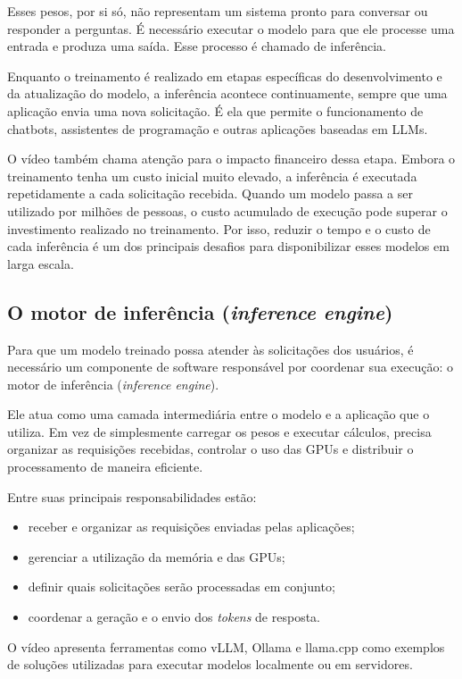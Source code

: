 \documentclass[12pt, a4paper]{article}
\begin{document}
Esses pesos, por si só, não representam um sistema pronto para conversar ou responder a perguntas. É necessário executar o modelo para que ele processe uma entrada e produza uma saída. Esse processo é chamado de inferência.

Enquanto o treinamento é realizado em etapas específicas do desenvolvimento e da atualização do modelo, a inferência acontece continuamente, sempre que uma aplicação envia uma nova solicitação. É ela que permite o funcionamento de chatbots, assistentes de programação e outras aplicações baseadas em LLMs.

O vídeo também chama atenção para o impacto financeiro dessa etapa. Embora o treinamento tenha um custo inicial muito elevado, a inferência é executada repetidamente a cada solicitação recebida. Quando um modelo passa a ser utilizado por milhões de pessoas, o custo acumulado de execução pode superar o investimento realizado no treinamento. Por isso, reduzir o tempo e o custo de cada inferência é um dos principais desafios para disponibilizar esses modelos em larga escala.

\subsection{O motor de inferência (\textit{inference engine})}

Para que um modelo treinado possa atender às solicitações dos usuários, é necessário um componente de software responsável por coordenar sua execução: o motor de inferência (\textit{inference engine}).

Ele atua como uma camada intermediária entre o modelo e a aplicação que o utiliza. Em vez de simplesmente carregar os pesos e executar cálculos, precisa organizar as requisições recebidas, controlar o uso das GPUs e distribuir o processamento de maneira eficiente.

Entre suas principais responsabilidades estão:
\begin{itemize}[leftmargin=2em]
  \item receber e organizar as requisições enviadas pelas aplicações;
  \item gerenciar a utilização da memória e das GPUs;
  \item definir quais solicitações serão processadas em conjunto;
  \item coordenar a geração e o envio dos \textit{tokens} de resposta.
\end{itemize}

O vídeo apresenta ferramentas como vLLM, Ollama e llama.cpp como exemplos de soluções utilizadas para executar modelos localmente ou em servidores.
\end{document}
